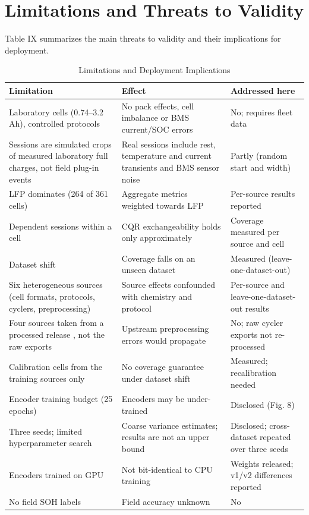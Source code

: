 \documentclass[journal]{IEEEtran}
\begin{document}
\section{Limitations and Threats to Validity}
Table IX summarizes the main threats to validity and their implications for deployment.

\begin{table}[!t]
\centering
\caption{Limitations and Deployment Implications}
\label{tab:9}
\scriptsize
\begin{tabularx}{\columnwidth}{@{}>{\raggedright\arraybackslash}X>{\raggedright\arraybackslash}X>{\raggedright\arraybackslash}X@{}}
\toprule
Limitation & Effect & Addressed here \\
\midrule
Laboratory cells (0.74--3.2 Ah), controlled protocols & No pack effects, cell imbalance or BMS current/SOC errors & No; requires fleet data \\
Sessions are simulated crops of measured laboratory full charges, not field plug-in events & Real sessions include rest, temperature and current transients and BMS sensor noise & Partly (random start and width) \\
LFP dominates (264 of 361 cells) & Aggregate metrics weighted towards LFP & Per-source results reported \\
Dependent sessions within a cell & CQR exchangeability holds only approximately & Coverage measured per source and cell \\
Dataset shift & Coverage falls on an unseen dataset & Measured (leave-one-dataset-out) \\
Six heterogeneous sources (cell formats, protocols, cyclers, preprocessing) & Source effects confounded with chemistry and protocol & Per-source and leave-one-dataset-out results \\
Four sources taken from a processed release \cite{b24}, not the raw exports & Upstream preprocessing errors would propagate & No; raw cycler exports not re-processed \\
Calibration cells from the training sources only & No coverage guarantee under dataset shift & Measured; recalibration needed \\
Encoder training budget (25 epochs) & Encoders may be under-trained & Disclosed (Fig. 8) \\
Three seeds; limited hyperparameter search & Coarse variance estimates; results are not an upper bound & Disclosed; cross-dataset repeated over three seeds \\
Encoders trained on GPU & Not bit-identical to CPU training & Weights released; v1/v2 differences reported \\
No field SOH labels & Field accuracy unknown & No \\
\bottomrule
\end{tabularx}
\end{table}
\end{document}
